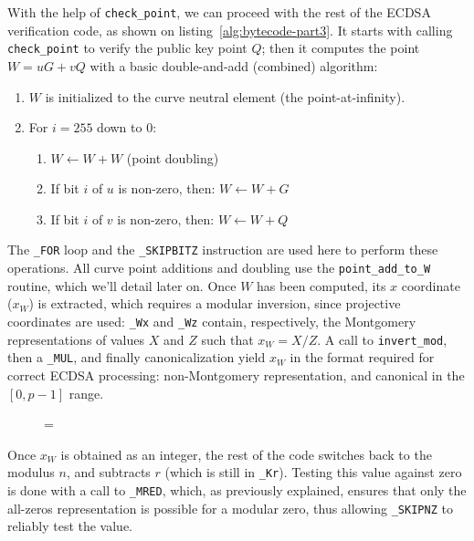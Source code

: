 \documentclass{llncs}
\newenvironment{forbidpagebreak}
    {\par\nobreak\vfil\penalty 0\vfilneg
     \vtop\bgroup}
    {\par\xdef\tpd{\the\prevdepth}\egroup
     \prevdepth=\tpd}
\begin{document}
With the help of \verb+check_point+, we can proceed with the rest of the
ECDSA verification code, as shown on listing~\ref{alg:bytecode-part3}.
It starts with calling \verb+check_point+ to verify the public key
point $Q$; then it computes the point $W = uG + vQ$ with a basic
double-and-add (combined) algorithm:
\begin{enumerate}

    \item $W$ is initialized to the curve neutral element (the
    point-at-infinity).

    \item For $i = 255$ down to $0$:
    \begin{enumerate}

        \item $W \leftarrow W + W$ (point doubling)

        \item If bit $i$ of $u$ is non-zero, then: $W \leftarrow W + G$

        \item If bit $i$ of $v$ is non-zero, then: $W \leftarrow W + Q$

    \end{enumerate}

\end{enumerate}
The \verb+_FOR+ loop and the \verb+_SKIPBITZ+ instruction are used here
to perform these operations. All curve point additions and doubling use
the \verb+point_add_to_W+ routine, which we'll detail later on. Once $W$
has been computed, its $x$ coordinate ($x_W$) is extracted, which
requires a modular inversion, since projective coordinates are used:
\verb+_Wx+ and \verb+_Wz+ contain, respectively, the Montgomery
representations of values $X$ and $Z$ such that $x_W = X/Z$. A call to
\verb+invert_mod+, then a \verb+_MUL+, and finally canonicalization
yield $x_W$ in the format required for correct ECDSA processing:
non-Montgomery representation, and canonical in the $[0, p-1]$ range.

\begin{figure}
\begin{forbidpagebreak}

\end{forbidpagebreak}
\end{figure}

Once $x_W$ is obtained as an integer, the rest of the code switches back
to the modulus $n$, and subtracts $r$ (which is still in \verb+_Kr+).
Testing this value against zero is done with a call to \verb+_MRED+,
which, as previously explained, ensures that only the all-zeros
representation is possible for a modular zero, thus allowing
\verb+_SKIPNZ+ to reliably test the value.
\end{document}
